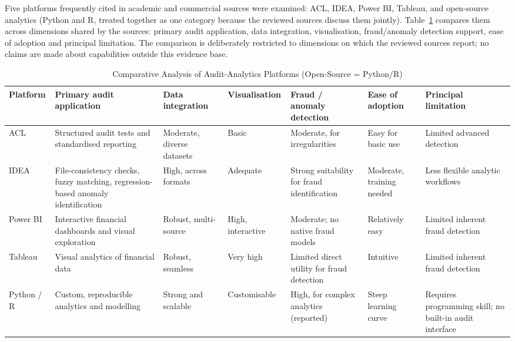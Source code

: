 \documentclass[conference]{IEEEtran}
\begin{document}
Five platforms frequently cited in academic and commercial sources were examined: ACL, IDEA, Power BI, Tableau, and open-source analytics (Python and R, treated together as one category because the reviewed sources discuss them jointly). Table~\ref{tab:tools} compares them across dimensions shared by the sources: primary audit application, data integration, visualisation, fraud/anomaly detection support, ease of adoption and principal limitation. The comparison is deliberately restricted to dimensions on which the reviewed sources report; no claims are made about capabilities outside this evidence base.

\begin{table}[!t]
\caption{Comparative Analysis of Audit-Analytics Platforms (Open-Source = Python/R)}
\label{tab:tools}
\centering
\scriptsize
\setlength{\tabcolsep}{4pt}
\begin{tabular}{p{} p{} p{} p{} p{} p{} p{}}
\toprule
\textbf{Platform} & \textbf{Primary audit application} & \textbf{Data integration} & \textbf{Visualisation} & \textbf{Fraud / anomaly detection} & \textbf{Ease of adoption} & \textbf{Principal limitation} \\
\midrule
ACL & Structured audit tests and standardised reporting & Moderate, diverse datasets & Basic & Moderate, for irregularities & Easy for basic use & Limited advanced detection \cite{b26} \\
IDEA & File-consistency checks, fuzzy matching, regression-based anomaly identification & High, across formats & Adequate & Strong suitability for fraud identification & Moderate, training needed & Less flexible analytic workflows \cite{b27} \\
Power BI & Interactive financial dashboards and visual exploration & Robust, multi-source & High, interactive & Moderate; no native fraud models & Relatively easy & Limited inherent fraud detection \cite{b28} \\
Tableau & Visual analytics of financial data & Robust, seamless & Very high & Limited direct utility for fraud detection & Intuitive & Limited inherent fraud detection \cite{b29} \\
Python / R & Custom, reproducible analytics and modelling & Strong and scalable & Customisable & High, for complex analytics (reported) & Steep learning curve & Requires programming skill; no built-in audit interface \cite{b30} \\
\bottomrule
\end{tabular}
\end{table}
\end{document}
